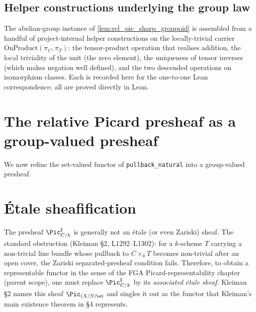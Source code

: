 \subsection{Helper constructions underlying the group law}
\label{subsec:relpic_group_helpers}

The abelian-group instance of \cref{lem:rel_pic_sharp_groupoid} is assembled
from a handful of project-internal helper constructions on the locally-trivial
carrier \(\mathrm{OnProduct}(\pi_C, \pi_T)\): the tensor-product operation that
realises addition, the local triviality of the unit (the zero element), the
uniqueness of tensor inverses (which makes negation well defined), and the two
descended operations on isomorphism classes. Each is recorded here for the
one-to-one Lean correspondence; all are proved directly in Lean.

\section{The relative Picard presheaf as a group-valued presheaf}
\label{sec:relpic_groupvalued}

We now refine the set-valued functor of \texttt{pullback\_natural} into a
group-valued presheaf.


\section{\'Etale sheafification}
\label{sec:relpic_etale_sheaf}

The presheaf \(\Pic^\sharp_{C/k}\) is generally not an \'etale (or even Zariski)
sheaf. The standard obstruction (Kleiman \S 2, L1292--L1302): for a \(k\)-scheme
\(T\) carrying a non-trivial line bundle whose pullback to \(C \times_k T\) becomes
non-trivial after an open cover, the Zariski separated-presheaf condition
fails. Therefore, to obtain a representable functor in the sense of
the FGA Picard-representability chapter (parent scope), one must replace
\(\Pic^\sharp_{C/k}\) by its \emph{associated \'etale sheaf}. Kleiman \S 2 names
this sheaf \(\Pic_{(X/S)\et}\) and singles it out as the functor that Kleiman's
main existence theorem in \S 4 represents.

